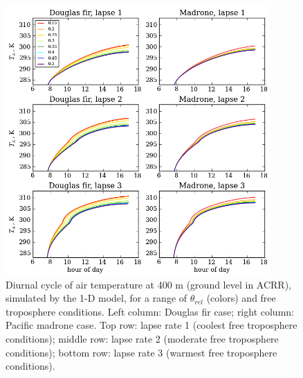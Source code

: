 \begin{figure}[here]
\includegraphics[width=0.9\textwidth]{ch2-BL/figures/testall_compare_sm_lapse_Ta_cropped.png}
\caption{Diurnal cycle of air temperature at 400 m (ground level in ACRR), simulated by the 1-D model, for a range of $\theta_{rel}$ (colors) and free troposphere conditions.  Left column: Douglas fir case; right column: Pacific madrone case.  Top row: lapse rate 1 (coolest free troposphere conditions); middle row: lapse rate 2 (moderate free troposphere conditions); bottom row: lapse rate 3 (warmest free troposphere conditions).}
\label{fig:BL_1DdiurnalTa}
\end{figure}

